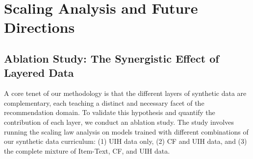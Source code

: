 \documentclass[]{fairmeta}
\begin{document}

\section{Scaling Analysis and Future Directions}
\subsection{Ablation Study: The Synergistic Effect of Layered Data}
A core tenet of our methodology is that the different layers of synthetic data are complementary, each teaching a distinct and necessary facet of the recommendation domain. To validate this hypothesis and quantify the contribution of each layer, we conduct an ablation study. The study involves running the scaling law analysis on models trained with different combinations of our synthetic data curriculum: (1) UIH data only, (2) CF and UIH data, and (3) the complete mixture of Item-Text, CF, and UIH data.
\end{document}
